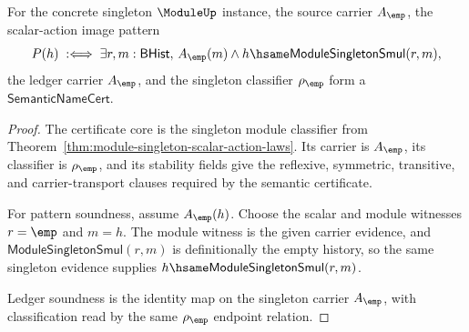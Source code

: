 \begin{theorem}
\label{thm:module-singleton-smul-image-semantic-name-cert}
For the concrete singleton $\ModuleUp$ instance, the source carrier $A_{\emp}$,
the scalar-action image pattern
$$
P(h)\;:\Longleftrightarrow\;\exists r,m:\mathsf{BHist},\,
  A_{\emp}(m)\wedge h\hsame\mathsf{ModuleSingletonSmul}(r,m),
$$
the ledger carrier $A_{\emp}$, and the singleton classifier $\rho_{\emp}$ form a
$\mathsf{SemanticNameCert}$.
\end{theorem}
\begin{proof}
The certificate core is the singleton module classifier from
Theorem~\ref{thm:module-singleton-scalar-action-laws}. Its carrier is
$A_{\emp}$, its classifier is $\rho_{\emp}$, and its stability fields give the
reflexive, symmetric, transitive, and carrier-transport clauses required by the
semantic certificate.

For pattern soundness, assume $A_{\emp}(h)$. Choose the scalar and module
witnesses $r=\emp$ and $m=h$. The module witness is the given carrier evidence,
and $\mathsf{ModuleSingletonSmul}(r,m)$ is definitionally the empty history, so
the same singleton evidence supplies $h\hsame\mathsf{ModuleSingletonSmul}(r,m)$.

Ledger soundness is the identity map on the singleton carrier $A_{\emp}$, with
classification read by the same $\rho_{\emp}$ endpoint relation.
\end{proof}

